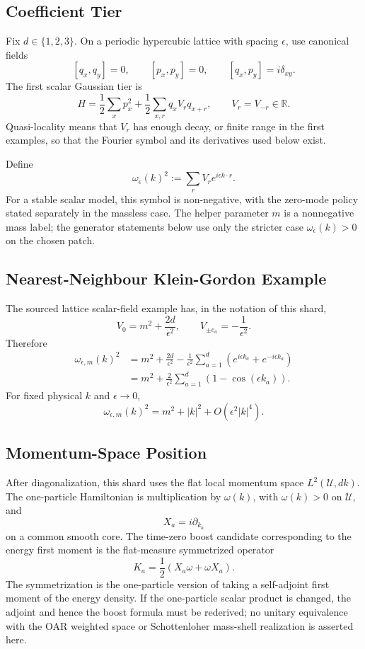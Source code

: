 \subsection{Coefficient Tier}

Fix \(d\in\{1,2,3\}\).  On a periodic hypercubic lattice with spacing
\(\epsilon\), use canonical fields
\[
  [q_x,q_y]=0,\qquad [p_x,p_y]=0,\qquad [q_x,p_y]=i\delta_{xy}.
\]
The first scalar Gaussian tier is
\[
  H=\frac{1}{2}\sum_x p_x^2
    +\frac{1}{2}\sum_{x,r}q_xV_rq_{x+r},
  \qquad V_r=V_{-r}\in\mathbb R.
\]
Quasi-locality means that \(V_r\) has enough decay, or finite range in the first
examples, so that the Fourier symbol and its derivatives used below exist.

Define
\[
  \omega_\epsilon(k)^2
  :=
  \sum_r V_r e^{i\epsilon k\cdot r}.
\]
For a stable scalar model, this symbol is non-negative, with the zero-mode
policy stated separately in the massless case.  The helper parameter \(m\) is a
nonnegative mass label; the generator statements below use only the stricter
case \(\omega_\epsilon(k)>0\) on the chosen patch.

\subsection{Nearest-Neighbour Klein-Gordon Example}

The sourced lattice scalar-field example has, in the notation of this shard,
\[
  V_0=m^2+\frac{2d}{\epsilon^2},
  \qquad
  V_{\pm e_a}=-\frac{1}{\epsilon^2}.
\]
Therefore
\[
\begin{aligned}
  \omega_{\epsilon,m}(k)^2
  &=
    m^2+\frac{2d}{\epsilon^2}
    -\frac{1}{\epsilon^2}\sum_{a=1}^d
      (e^{i\epsilon k_a}+e^{-i\epsilon k_a})\\
  &=
    m^2+\frac{2}{\epsilon^2}\sum_{a=1}^d(1-\cos(\epsilon k_a)).
\end{aligned}
\]
For fixed physical \(k\) and \(\epsilon\to0\),
\[
  \omega_{\epsilon,m}(k)^2
  =
  m^2+|k|^2+O(\epsilon^2|k|^4).
\]

\subsection{Momentum-Space Position}

After diagonalization, this shard uses the flat local momentum space
\(L^2(\mathcal U,dk)\).  The one-particle Hamiltonian is multiplication by
\(\omega(k)\), with \(\omega(k)>0\) on \(\mathcal U\), and
\[
  X_a=i\partial_{k_a}
\]
on a common smooth core.  The time-zero boost candidate corresponding to the
energy first moment is the flat-measure symmetrized operator
\[
  K_a=\frac{1}{2}(X_a\omega+\omega X_a).
\]
The symmetrization is the one-particle version of taking a self-adjoint first
moment of the energy density.  If the one-particle scalar product is changed,
the adjoint and hence the boost formula must be rederived; no unitary
equivalence with the OAR weighted space or Schottenloher mass-shell realization
is asserted here.

